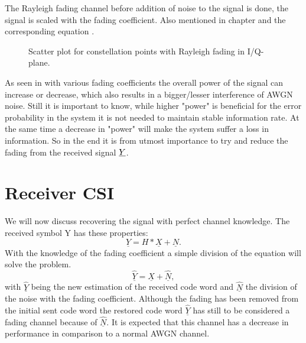 The Rayleigh fading channel before addition of noise to the signal is done, the signal is scaled with the fading coefficient. Also mentioned in chapter  and the corresponding equation .
\begin{figure}[!htb]
	\setlength{}
	\setlength\fheight{0.4\textheight}
	\centering
		
	\caption{Scatter plot for constellation points with Rayleigh fading in I/Q-plane.}
	\label{fig:scatter}
\end{figure}
As seen in  with various fading coefficients the overall power of the signal can increase or decrease, which also results in a bigger/lesser interference of AWGN noise. Still it is important to know, while higher "power" is beneficial for the error probability in the system it is not needed to maintain stable information rate. At the same time a decrease in "power" will make the system suffer a loss in information. So in the end it is from utmost importance to try and reduce the fading from the received signal $\boldmath\underline{Y}$.
\clearpage
\section{Receiver CSI}
We will now discuss recovering the signal with perfect channel knowledge. The received symbol Y has these properties: 
\begin{equation}
\label{eq:raychan}
\underline{Y} = H * \underline{X} + \underline{N}.
\end{equation}
With the knowledge of the fading coefficient a simple division of the equation will solve the problem.
\begin{equation}
\label{eq:raychan2}
\underline{\hat{Y}} = \underline{X} + \underline{\hat{N}},
\end{equation}
with $\underline{\hat{Y}}$ being the new estimation of the received code word and $\underline{\hat{N}}$ the division of the noise with the fading coefficient.
Although the fading has been removed from the initial sent code word the restored code word \textbf{$\underline{\hat{Y}}$} has still to be considered a fading channel because of $\underline{\hat{N}}$. It is expected that this channel has a decrease in performance in comparison to a normal AWGN channel.

